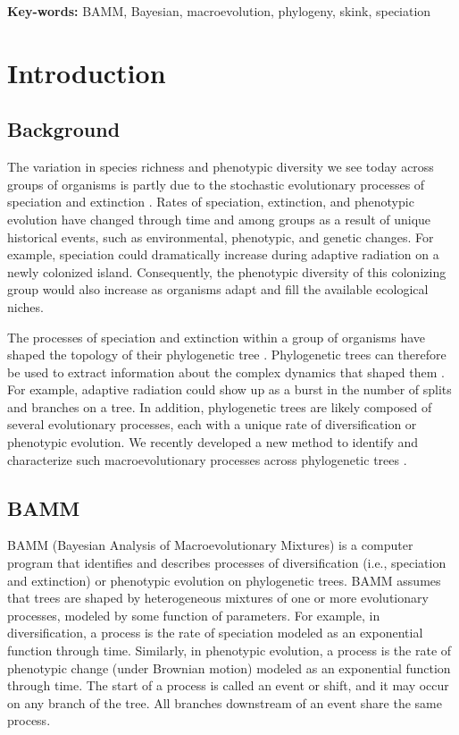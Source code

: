 \documentclass[12pt]{article}
\begin{document}
\begin{flushleft}
\textbf{Key-words:} BAMM, Bayesian, macroevolution, phylogeny, skink, speciation
\end{flushleft}


\pagebreak[4]


\section*{Introduction}

\subsection*{Background}

The variation in species richness and phenotypic diversity we see today
across groups of organisms is partly due to the stochastic
evolutionary processes of speciation and extinction \citep{rab14plos}.
%
Rates of speciation, extinction, and phenotypic evolution
have changed through time and among groups
as a result of unique historical events,
such as environmental, phenotypic, and genetic changes.
%
For example, speciation could dramatically increase
during adaptive radiation on a newly colonized island.
%
Consequently, the phenotypic diversity of this colonizing group
would also increase as organisms adapt and fill
the available ecological niches.


The processes of speciation and extinction within a group of organisms
have shaped the topology of their phylogenetic tree \citep{nee94}.
%
Phylogenetic trees can therefore be used to extract
information about the complex dynamics that shaped them \citep{rab14plos}.
%
For example, adaptive radiation could show up
as a burst in the number of splits and branches on a tree.
%
In addition,
phylogenetic trees are likely composed of several evolutionary processes,
each with a unique rate of diversification or phenotypic evolution.
%
We recently developed a new method to identify and characterize
such macroevolutionary processes across phylogenetic trees \citep{rab14plos}.


\subsection*{BAMM}

BAMM (Bayesian Analysis of Macroevolutionary Mixtures)
is a computer program that identifies and describes
processes of diversification (i.e., speciation and extinction)
or phenotypic evolution on phylogenetic trees.
%
BAMM assumes that trees are shaped by heterogeneous mixtures
of one or more evolutionary processes,
modeled by some function of parameters.
%
For example, in diversification,
a process is the rate of speciation
modeled as an exponential function through time.
%
Similarly, in phenotypic evolution,
a process is the rate of phenotypic change (under Brownian motion)
modeled as an exponential function through time.
%
The start of a process is called an event or shift,
and it may occur on any branch of the tree.
%
All branches downstream of an event share the same process.
\end{document}
